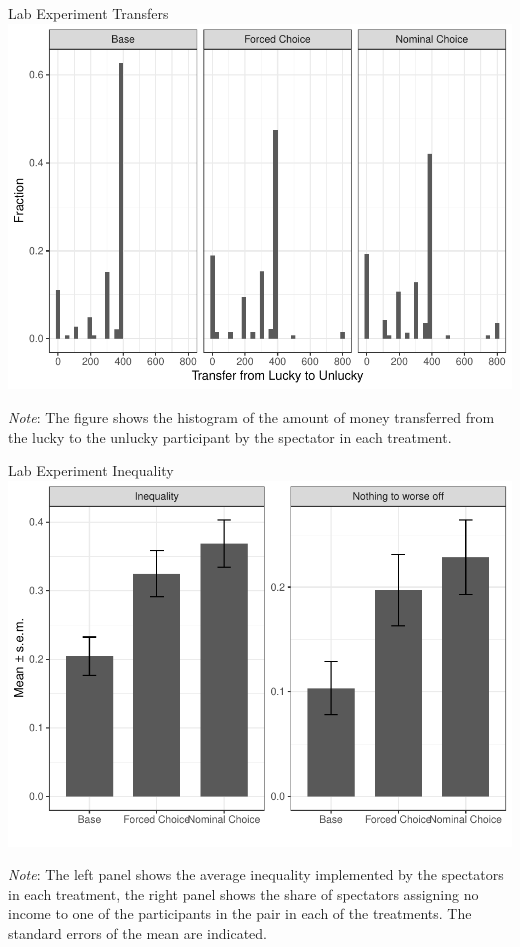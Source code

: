 \documentclass{beamer}
\begin{document}
  	\begin{frame}{Lab Experiment Transfers}
		\includegraphics[height=.7\textheight]{../graphs/histograms_lab.pdf}

		{\tiny
			\emph{Note}: The figure shows the histogram of the amount of money transferred from the lucky to the unlucky participant by the spectator in each treatment.}
	\end{frame}
\begin{frame}{Lab Experiment Inequality}
	\includegraphics[height=.75\textheight]{../graphs/mean_ineq_nothing_lab.pdf}

		{\tiny
		\emph{Note}: The left panel shows the average inequality implemented by the spectators in each
		treatment, the right panel shows the share of spectators assigning no income to one of the
		participants in the pair in each of the treatments. The standard errors of the mean are indicated.}
\end{frame}
\end{document}
